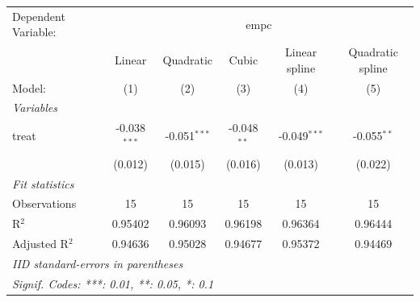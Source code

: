 
\begingroup
\centering
\begin{tabular}{lccccc}
   \tabularnewline \midrule \midrule
   Dependent Variable: & \multicolumn{5}{c}{empc}\\
                  & Linear         & Quadratic      & Cubic         & Linear spline  & Quadratic spline \\   
   Model:         & (1)            & (2)            & (3)           & (4)            & (5)\\  
   \midrule
   \emph{Variables}\\
   treat          & -0.038$^{***}$ & -0.051$^{***}$ & -0.048$^{**}$ & -0.049$^{***}$ & -0.055$^{**}$\\   
                  & (0.012)        & (0.015)        & (0.016)       & (0.013)        & (0.022)\\   
   \midrule
   \emph{Fit statistics}\\
   Observations   & 15             & 15             & 15            & 15             & 15\\  
   R$^2$          & 0.95402        & 0.96093        & 0.96198       & 0.96364        & 0.96444\\  
   Adjusted R$^2$ & 0.94636        & 0.95028        & 0.94677       & 0.95372        & 0.94469\\  
   \midrule \midrule
   \multicolumn{6}{l}{\emph{IID standard-errors in parentheses}}\\
   \multicolumn{6}{l}{\emph{Signif. Codes: ***: 0.01, **: 0.05, *: 0.1}}\\
\end{tabular}
\par\endgroup


